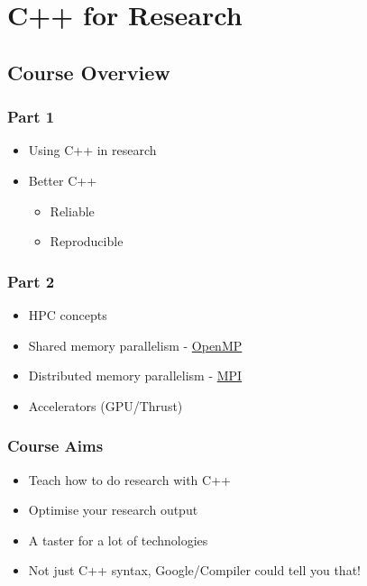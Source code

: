 \section{C++ for Research}\label{c-for-research}

\subsection{Course Overview}\label{course-overview}

\subsubsection{Part 1}\label{part-1}

\begin{itemize}
\itemsep1pt\parskip0pt
\item
  Using C++ in research
\item
  Better C++

  \begin{itemize}
  \itemsep1pt\parskip0pt
  \item
    Reliable
  \item
    Reproducible
  \end{itemize}
\end{itemize}

\subsubsection{Part 2}\label{part-2}

\begin{itemize}
\itemsep1pt\parskip0pt
\item
  HPC concepts
\item
  Shared memory parallelism - \href{http://www.openmp.org}{OpenMP}
\item
  Distributed memory parallelism - \href{http://www.open-mpi.org}{MPI}
\item
  Accelerators (GPU/Thrust)
\end{itemize}

\subsubsection{Course Aims}\label{course-aims}

\begin{itemize}
\itemsep1pt\parskip0pt
\item
  Teach how to do research with C++
\item
  Optimise your research output
\item
  A taster for a lot of technologies
\item
  Not just C++ syntax, Google/Compiler could tell you that!
\end{itemize}


